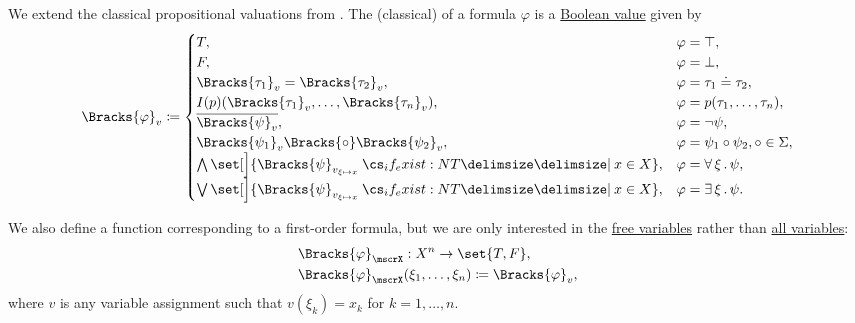 \begin{definition}
\begin{thmenum}
     We extend the classical propositional valuations from . The (classical)  of a formula \( \varphi \) is a \hyperref[def:boolean_value]{Boolean value} given by
    \begin{equation}\label{eq:def:first_order_valuation/formula_valuation}
      \Bracks{\varphi}_v \coloneqq \begin{cases}
        T,                                                                        &\varphi = \top, \\
        F,                                                                        &\varphi = \bot, \\
        \Bracks{\tau_1}_v = \Bracks{\tau_2}_v,                                    &\varphi = \tau_1 \doteq \tau_2, \\
        I(p)(\Bracks{\tau_1}_v, \ldots, \Bracks{\tau_n}_v),                       &\varphi = p(\tau_1, \ldots, \tau_n), \\
        \overline{\Bracks{\psi}_v},                                               &\varphi = \neg \psi, \\
        \Bracks{\psi_1}_v \Bracks{\bincirc} \Bracks{\psi_2}_v,                    &\varphi = \psi_1 \bincirc \psi_2, \bincirc \in \Sigma, \\
        \bigwedge\set[\Big]{ \Bracks{\psi}_{v_{\xi \mapsto x}} \given* x \in X },   &\varphi = \qforall \xi \psi, \\
        \bigvee\set[\Big]{ \Bracks{\psi}_{v_{\xi \mapsto x}} \given* x \in X }, &\varphi = \qexists \xi \psi.
      \end{cases}
    \end{equation}

     We also define a function corresponding to a first-order formula, but we are only interested in the \hyperref[def:first_order_syntax/formula_free_variables]{free variables} rather than \hyperref[def:first_order_syntax/formula_variables]{all variables}:
    \begin{equation*}
      \begin{aligned}
        &\Bracks{\varphi}_\mscrX: X^n \to \set{ T, F }, \\
        &\Bracks{\varphi}_\mscrX(\xi_1, \ldots, \xi_n) \coloneqq \Bracks{\varphi}_v,
      \end{aligned}
    \end{equation*}
    where \( v \) is any variable assignment such that \( v(\xi_k) = x_k \) for \( k = 1, \ldots, n \).
  \end{thmenum}
\end{definition}
